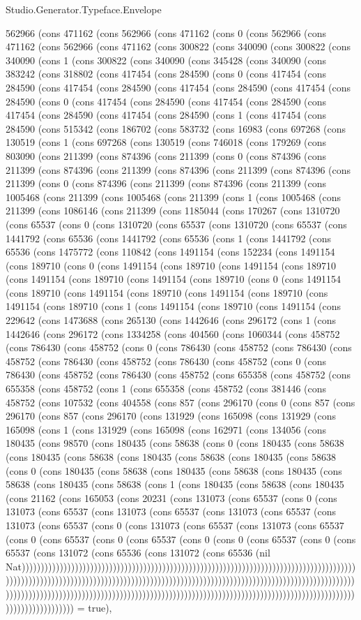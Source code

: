\begin{lexlean}{Studio.Generator.Typeface.Envelope}
\begin{semanticmodule}
{562966 (cons 471162 (cons 562966 (cons 471162 (cons 0 (cons 562966 (cons 471162 (cons 562966 (cons 471162 (cons 300822 (cons 340090 (cons 300822 (cons 340090 (cons 1 (cons 300822 (cons 340090 (cons 345428 (cons 340090 (cons 383242 (cons 318802 (cons 417454 (cons 284590 (cons 0 (cons 417454 (cons 284590 (cons 417454 (cons 284590 (cons 417454 (cons 284590 (cons 417454 (cons 284590 (cons 0 (cons 417454 (cons 284590 (cons 417454 (cons 284590 (cons 417454 (cons 284590 (cons 417454 (cons 284590 (cons 1 (cons 417454 (cons 284590 (cons 515342 (cons 186702 (cons 583732 (cons 16983 (cons 697268 (cons 130519 (cons 1 (cons 697268 (cons 130519 (cons 746018 (cons 179269 (cons 803090 (cons 211399 (cons 874396 (cons 211399 (cons 0 (cons 874396 (cons 211399 (cons 874396 (cons 211399 (cons 874396 (cons 211399 (cons 874396 (cons 211399 (cons 0 (cons 874396 (cons 211399 (cons 874396 (cons 211399 (cons 1005468 (cons 211399 (cons 1005468 (cons 211399 (cons 1 (cons 1005468 (cons 211399 (cons 1086146 (cons 211399 (cons 1185044 (cons 170267 (cons 1310720 (cons 65537 (cons 0 (cons 1310720 (cons 65537 (cons 1310720 (cons 65537 (cons 1441792 (cons 65536 (cons 1441792 (cons 65536 (cons 1 (cons 1441792 (cons 65536 (cons 1475772 (cons 110842 (cons 1491154 (cons 152234 (cons 1491154 (cons 189710 (cons 0 (cons 1491154 (cons 189710 (cons 1491154 (cons 189710 (cons 1491154 (cons 189710 (cons 1491154 (cons 189710 (cons 0 (cons 1491154 (cons 189710 (cons 1491154 (cons 189710 (cons 1491154 (cons 189710 (cons 1491154 (cons 189710 (cons 1 (cons 1491154 (cons 189710 (cons 1491154 (cons 229642 (cons 1473688 (cons 265130 (cons 1442646 (cons 296172 (cons 1 (cons 1442646 (cons 296172 (cons 1334258 (cons 404560 (cons 1060344 (cons 458752 (cons 786430 (cons 458752 (cons 0 (cons 786430 (cons 458752 (cons 786430 (cons 458752 (cons 786430 (cons 458752 (cons 786430 (cons 458752 (cons 0 (cons 786430 (cons 458752 (cons 786430 (cons 458752 (cons 655358 (cons 458752 (cons 655358 (cons 458752 (cons 1 (cons 655358 (cons 458752 (cons 381446 (cons 458752 (cons 107532 (cons 404558 (cons 857 (cons 296170 (cons 0 (cons 857 (cons 296170 (cons 857 (cons 296170 (cons 131929 (cons 165098 (cons 131929 (cons 165098 (cons 1 (cons 131929 (cons 165098 (cons 162971 (cons 134056 (cons 180435 (cons 98570 (cons 180435 (cons 58638 (cons 0 (cons 180435 (cons 58638 (cons 180435 (cons 58638 (cons 180435 (cons 58638 (cons 180435 (cons 58638 (cons 0 (cons 180435 (cons 58638 (cons 180435 (cons 58638 (cons 180435 (cons 58638 (cons 180435 (cons 58638 (cons 1 (cons 180435 (cons 58638 (cons 180435 (cons 21162 (cons 165053 (cons 20231 (cons 131073 (cons 65537 (cons 0 (cons 131073 (cons 65537 (cons 131073 (cons 65537 (cons 131073 (cons 65537 (cons 131073 (cons 65537 (cons 0 (cons 131073 (cons 65537 (cons 131073 (cons 65537 (cons 0 (cons 65537 (cons 0 (cons 65537 (cons 0 (cons 0 (cons 65537 (cons 0 (cons 65537 (cons 131072 (cons 65536 (cons 131072 (cons 65536 (nil Nat)))))))))))))))))))))))))))))))))))))))))))))))))))))))))))))))))))))))))))))))))))))))))))))))))))))))))))))))))))))))))))))))))))))))))))))))))))))))))))))))))))))))))))))))))))))))))))))))))))))))))))))))))))))))))))))))))))))))))))))))))))))))))))))))))))))))))))))))))))))))))))))))))) = true),
}
\end{semanticmodule}
\end{lexlean}
